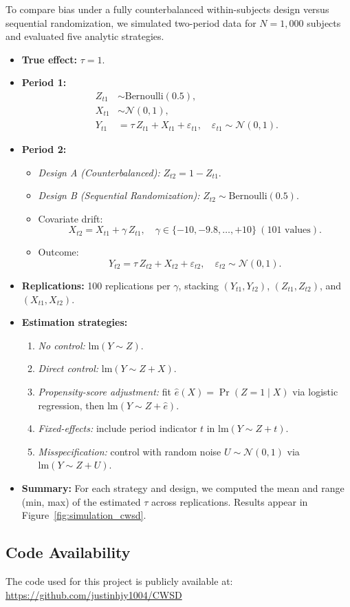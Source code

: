 To compare bias under a fully counterbalanced within-subjects design versus sequential randomization, we simulated two-period data for \(N = 1{,}000\) subjects and evaluated five analytic strategies.

\begin{itemize}
  \item \textbf{True effect:} \(\tau = 1\).
  \item \textbf{Period 1:}
    \begin{align*}
      Z_{t1} &\sim \mathrm{Bernoulli}(0.5),\\
      X_{t1} &\sim \mathcal{N}(0,1),\\
      Y_{t1} &= \tau\,Z_{t1} + X_{t1} + \varepsilon_{t1},\quad \varepsilon_{t1}\sim \mathcal{N}(0,1).
    \end{align*}
  \item \textbf{Period 2:}
    \begin{itemize}
      \item \emph{Design A (Counterbalanced):} \(Z_{t2} = 1 - Z_{t1}\).
      \item \emph{Design B (Sequential Randomization):} \(Z_{t2}\sim \mathrm{Bernoulli}(0.5)\).
      \item Covariate drift:
        \[
          X_{t2} = X_{t1} + \gamma\,Z_{t1},\quad \gamma\in\{-10, -9.8, \dots, +10\}\ (\text{101 values}).
        \]
      \item Outcome:
        \[
          Y_{t2} = \tau\,Z_{t2} + X_{t2} + \varepsilon_{t2},\quad \varepsilon_{t2}\sim \mathcal{N}(0,1).
        \]
    \end{itemize}
  \item \textbf{Replications:} 100 replications per \(\gamma\), stacking \((Y_{t1},Y_{t2})\), \((Z_{t1},Z_{t2})\), and \((X_{t1},X_{t2})\).
  \item \textbf{Estimation strategies:}
    \begin{enumerate}
      \item \emph{No control:} \(\mathrm{lm}(Y \sim Z)\).
      \item \emph{Direct control:} \(\mathrm{lm}(Y \sim Z + X)\).
      \item \emph{Propensity-score adjustment:} fit \(\hat e(X) = \Pr(Z=1\mid X)\) via logistic regression, then \(\mathrm{lm}(Y \sim Z + \hat e)\).
      \item \emph{Fixed-effects:} include period indicator \(t\) in \(\mathrm{lm}(Y \sim Z + t)\).
      \item \emph{Misspecification:} control with random noise \(U \sim \mathcal{N}(0,1)\) via \(\mathrm{lm}(Y \sim Z + U)\).
    \end{enumerate}
  \item \textbf{Summary:} For each strategy and design, we computed the mean and range (min, max) of the estimated \(\tau\) across replications.  Results appear in Figure~\ref{fig:simulation_cwsd}.
\end{itemize}

\subsection*{Code Availability}
The code used for this project is publicly available at: \url{https://github.com/justinhjy1004/CWSD}

